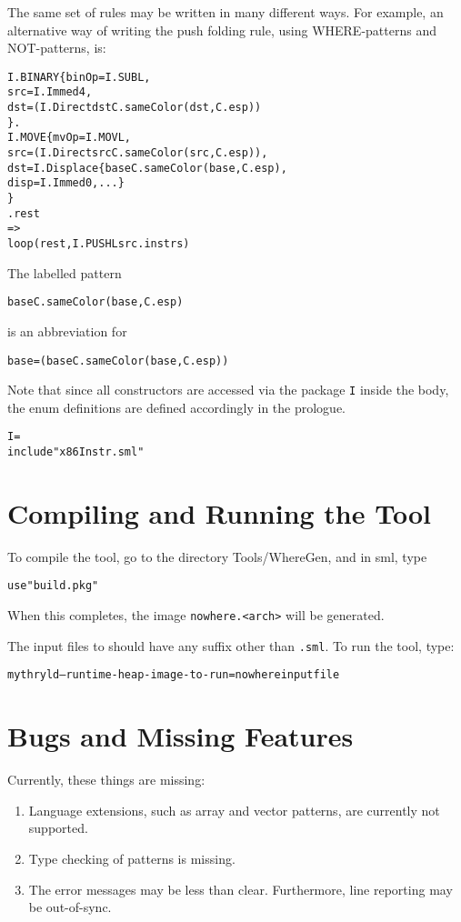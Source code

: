 The same set of rules may be written in many different ways.
For example, an alternative way of writing the push folding rule, using
WHERE-patterns and NOT-patterns, is:
\begin{alltt}
     I.BINARY\{binOp=I.SUBL, 
               src=I.Immed 4, 
               dst=(I.Direct dst \WHERE C.sameColor(dst,C.esp))
             \} . 
     I.MOVE\{mvOp=I.MOVL,
             src=\NOT (I.Direct src \WHERE C.sameColor(src,C.esp)),
             dst=I.Displace\{base \WHERE C.sameColor(base,C.esp),
                             disp=I.Immed 0, ...\}
           \}
     . rest 
        =>
         loop(rest, I.PUSHL src . instrs)
\end{alltt}
The labelled pattern 
\begin{alltt}
   base \WHERE C.sameColor(base,C.esp)
\end{alltt}
is an abbreviation for 
\begin{alltt}
   base=(base \WHERE C.sameColor(base,C.esp))
\end{alltt}

Note that since all constructors are accessed via the package \verb|I|
inside the body, 
the enum definitions are defined accordingly in the prologue.
\begin{alltt}
   \PACKAGE I = 
   \STRUCT
      include "x86Instr.sml" 
   \END
\end{alltt}

\section{Compiling and Running the Tool}

To compile the tool, go to the directory Tools/WhereGen, and in sml, type
\begin{alltt}
   use "build.pkg"
\end{alltt}
When this completes, the image \verb|nowhere.<arch>| will be generated.

The input files to \nowhere{} should have any suffix other than \verb|.sml|.
To run the tool, type:
\begin{alltt}
    mythryld --runtime-heap-image-to-run=nowhere inputfile
\end{alltt}

\section{Bugs and Missing Features}
   Currently, these things are missing:
\begin{enumerate}
  \item Language extensions, such as array and vector patterns, are currently not supported. 
  \item Type checking of patterns is missing.
  \item The error messages may be less than clear.  Furthermore, 
        line reporting may be out-of-sync.
\end{enumerate}


